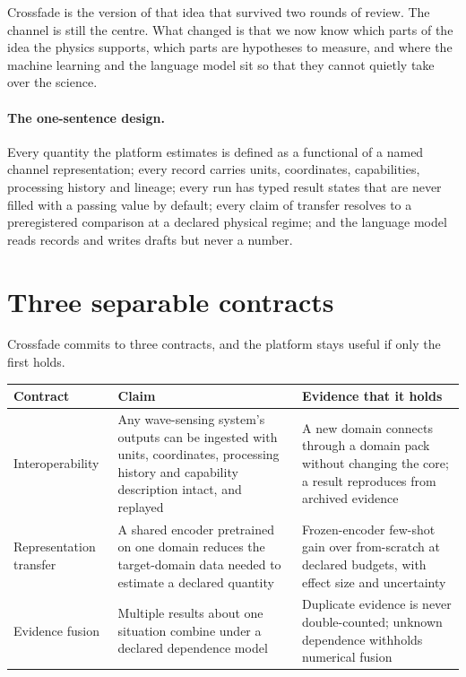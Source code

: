 \documentclass[11pt,a4paper]{article}
\begin{document}
Crossfade is the version of that idea that survived two rounds of review. The channel is still the centre. What changed is that we now know which parts of the idea the physics supports, which parts are hypotheses to measure, and where the machine learning and the language model sit so that they cannot quietly take over the science.

\paragraph{The one-sentence design.} Every quantity the platform estimates is defined as a functional of a named channel representation; every record carries units, coordinates, capabilities, processing history and lineage; every run has typed result states that are never filled with a passing value by default; every claim of transfer resolves to a preregistered comparison at a declared physical regime; and the language model reads records and writes drafts but never a number.

\section{Three separable contracts}

Crossfade commits to three contracts, and the platform stays useful if only the first holds.

\begin{center}\small
\begin{tabular}{@{}p{3.2cm}p{5.6cm}p{6cm}@{}}
\toprule
Contract & Claim & Evidence that it holds \\
\midrule
Interoperability & Any wave-sensing system's outputs can be ingested with units, coordinates, processing history and capability description intact, and replayed & A new domain connects through a domain pack without changing the core; a result reproduces from archived evidence \\
Representation transfer & A shared encoder pretrained on one domain reduces the target-domain data needed to estimate a declared quantity & Frozen-encoder few-shot gain over from-scratch at declared budgets, with effect size and uncertainty \\
Evidence fusion & Multiple results about one situation combine under a declared dependence model & Duplicate evidence is never double-counted; unknown dependence withholds numerical fusion \\
\bottomrule
\end{tabular}
\end{center}
\end{document}
